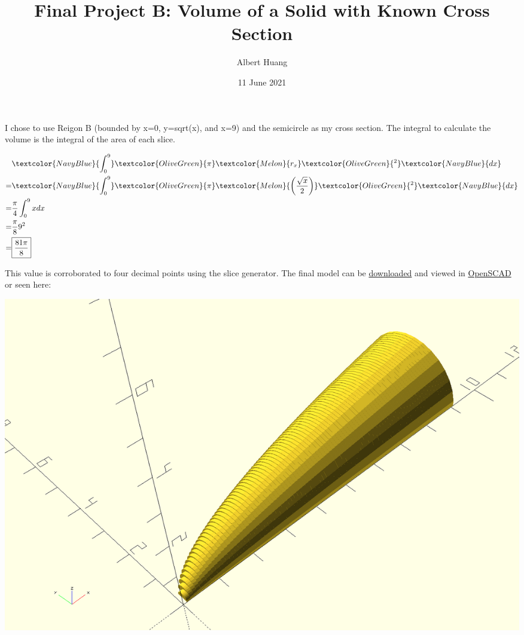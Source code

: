 \documentclass[letterpaper]{article}
\author{Albert Huang}
\date{11 June 2021}
\title{Final Project B: Volume of a Solid with Known Cross Section}
\renewcommand\maketitle{}
\begin{document}
\maketitle
I chose to use Reigon B (bounded by x=0, y=sqrt(x), and x=9) and the semicircle as my cross section. The integral to calculate the volume is \color{NavyBlue}the integral of \color{OliveGreen}the area of \color{Melon}each slice\color{Black}.

\[\begin{aligned}
 &\textcolor{NavyBlue}{\int_{0}^{9}} \textcolor{OliveGreen}{\pi} \textcolor{Melon}{r_x} \textcolor{OliveGreen}{^2} \textcolor{NavyBlue}{dx}\\
 =&\textcolor{NavyBlue}{\int_{0}^{9}} \textcolor{OliveGreen}{\pi}  \textcolor{Melon}{\left(\frac{\sqrt{x}}{2}\right)}\textcolor{OliveGreen}{^2} \textcolor{NavyBlue}{dx}\\
 =& \frac{\pi}{4}  \int_{0}^{9} x dx\\
 =& \frac{\pi}{8} 9^2\\
 =& \boxed{\frac{81\pi}{8}}\\
\end{aligned}\]

This value is corroborated to four decimal points using the slice generator. The final model can be \color{Blue}\href{https://github.com/SkoolNotes/Taproot/blob/main/21math401/KBe21math401retCrossSectionSolidFinalB.scad}{downloaded} \color{Black} and viewed in \color{Blue}\href{https://openscad.org/downloads.html}{OpenSCAD} \color{Black} or seen here:

\begin{center}
\includegraphics[width=.9\linewidth]{KBe21math401retCrossSectionSolidFinalB.png}
\end{center}
\end{document}
